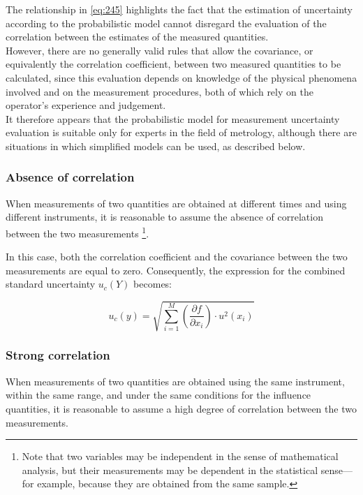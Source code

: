 \documentclass[../main.tex]{subfiles}
\begin{document}
The relationship in \autoref{eq:245} highlights the fact that the estimation of uncertainty according to the probabilistic model cannot disregard the evaluation of the correlation between the estimates of the measured quantities.\\

However, there are no generally valid rules that allow the covariance, or equivalently the correlation coefficient, between two measured quantities to be calculated, since this evaluation depends on knowledge of the physical phenomena involved and on the measurement procedures, both of which rely on the operator’s experience and judgement.\\

It therefore appears that the probabilistic model for measurement uncertainty evaluation is suitable only for experts in the field of metrology, although there are situations in which simplified models can be used, as described below.\\

\subsubsection*{Absence of correlation}

When measurements of two quantities are obtained at different times and using different instruments, it is reasonable to assume the absence of correlation between the two measurements \footnote{Note that two variables may be independent in the sense of mathematical analysis, but their measurements may be dependent in the statistical sense—for example, because they are obtained from the same sample.}.

In this case, both the correlation coefficient and the covariance between the two measurements are equal to zero. Consequently, the expression for the combined standard uncertainty $u_c(Y)$ becomes:

\begin{equation}
	u_c(y) = \sqrt{\sum_{i = 1}^M \left(  \frac{\partial f}{\partial x_i}\right) \cdot u^2(x_i)}
\end{equation}


\subsubsection*{Strong correlation}

When measurements of two quantities are obtained using the same instrument, within the same range, and under the same conditions for the influence quantities, it is reasonable to assume a high degree of correlation between the two measurements.\\
\end{document}
